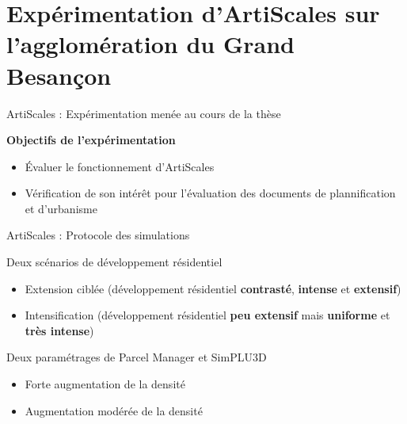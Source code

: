 \documentclass[xcolor=table]{beamer}
\begin{document}
\section[Expérimentation]{Expérimentation d'ArtiScales sur l'agglomération du Grand Besançon}





\begin{frame}{ArtiScales : Expérimentation menée au cours de la thèse}
	\begin{block}
		\textbf{Objectifs de l'expérimentation}\\
		\begin{itemize}
			\item Évaluer le fonctionnement d'ArtiScales
			\item Vérification de son intérêt pour l'évaluation des documents de plannification et d'urbanisme
		\end{itemize}
	\end{block}
\end{frame}

\begin{frame}{ArtiScales : Protocole des simulations}
	\begin{block}{Deux scénarios de développement résidentiel}
		\begin{itemize}
			\item Extension ciblée (développement résidentiel \textbf{contrasté}, \textbf{intense} et \textbf{extensif})
			\item Intensification (développement résidentiel \textbf{peu extensif} mais \textbf{uniforme} et \textbf{très intense})
		\end{itemize}
	\end{block}
	\begin{block}{Deux paramétrages de Parcel Manager et SimPLU3D}
	\begin{itemize}
		\item Forte augmentation de la densité
		\item Augmentation modérée de la densité
	\end{itemize}
\end{block}
\end{frame}
\end{document}
